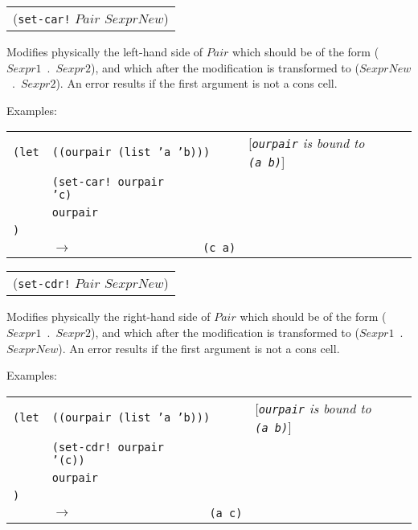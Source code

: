 \documentclass[11pt]{article} %
\newcommand{\scmsym}[1]{{\tt{#1}}}
\newcommand{\scmetavar}[1]{\ensuremath{\mathit{#1}}}
\newcommand{\scmcode}[1]{{\tt{#1}}}
\newenvironment{scmsimplefun}{\item[] \begin{tabular}{l}}{\\
\end{tabular}}
\newenvironment{scmexample}{Examples:\\
\begin{tabular}{l l l p{5cm}}}{\end{tabular}}
\newcommand{\scmexmcomment}[1]{[\emph{#1}]}
\newcommand{\ra}{\ensuremath{\rightarrow}\xspace}
\begin{document}
\begin{description}

\begin{scmsimplefun}
(\scmsym{set-car!} \scmetavar{Pair} \scmetavar{SexprNew})
\end{scmsimplefun}

Modifies physically the left-hand side of \scmetavar{Pair} which should
be of the form (\scmetavar{Sexpr1}~.~\scmetavar{Sexpr2}),
and which after the modification is transformed to
(\scmetavar{SexprNew}~.~\scmetavar{Sexpr2}).
An error results if the first argument is not a cons cell.

\begin{scmexample}



\scmcode{(let} & \multicolumn{2}{l}{\scmcode{((ourpair (list 'a 'b)))}}
 & \scmexmcomment{\scmsym{ourpair} is bound to \scmcode{(a~b)}}\\
& \scmcode{(set-car! ourpair 'c)}\\
& \scmcode{ourpair}\\
\scmcode{)}\\
& \ra & \scmcode{(c~a)}\\

\end{scmexample}


\begin{scmsimplefun}
(\scmsym{set-cdr!} \scmetavar{Pair} \scmetavar{SexprNew})
\end{scmsimplefun}

Modifies physically the right-hand side of \scmetavar{Pair} which should
be of the form (\scmetavar{Sexpr1}~.~\scmetavar{Sexpr2}),
and which after the modification is transformed to
(\scmetavar{Sexpr1}~.~\scmetavar{SexprNew}).
An error results if the first argument is not a cons cell.

\begin{scmexample}



\scmcode{(let} & \multicolumn{2}{l}{\scmcode{((ourpair (list 'a 'b)))}}
 & \scmexmcomment{\scmsym{ourpair} is bound to \scmcode{(a~b)}}\\
& \scmcode{(set-cdr! ourpair '(c))}\\
& \scmcode{ourpair}\\
\scmcode{)}\\
& \ra & \scmcode{(a~c)}\\

\end{scmexample}

\end{description}
\end{document}
